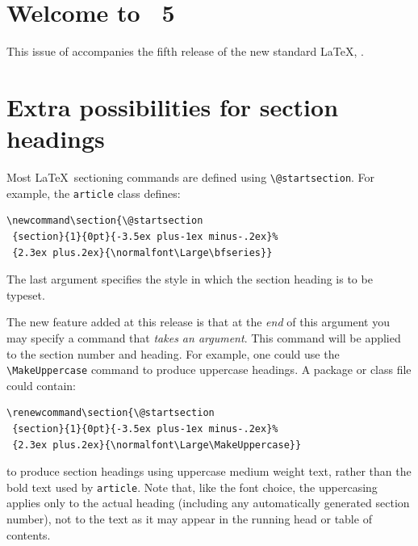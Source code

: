 \documentclass{ltnews}
\providecommand\cls[1]{\texttt{#1}}
\begin{document}
\maketitle

\section{Welcome to \LaTeXNews~5}
This  issue of \emph{\LaTeXNews} accompanies the fifth release of the
new standard \LaTeX{}, \LaTeXe.

\section{Extra possibilities for section headings}
Most \LaTeX\ sectioning commands are defined using
\verb|\@startsection|.
For example, the \cls{article} class defines:
\begin{small}
\begin{verbatim}
\newcommand\section{\@startsection
 {section}{1}{0pt}{-3.5ex plus-1ex minus-.2ex}%
 {2.3ex plus.2ex}{\normalfont\Large\bfseries}}
\end{verbatim}
\end{small}
The last argument specifies the style in which the section heading is
to be typeset.

The new feature added at this release is that at the \emph{end} of
this argument you may specify a command that \emph{takes an argument}.
This command will be applied to the section number and heading.
For example, one could use the \verb|\MakeUppercase| command to
produce uppercase headings. A package or class file could contain:
\begin{small}
\begin{verbatim}
\renewcommand\section{\@startsection
 {section}{1}{0pt}{-3.5ex plus-1ex minus-.2ex}%
 {2.3ex plus.2ex}{\normalfont\Large\MakeUppercase}}
\end{verbatim}
\end{small}
to produce section headings using uppercase medium weight text, rather
than the bold text used by \cls{article}. Note that, like the font
choice, the uppercasing applies only to the actual heading (including
any automatically generated section number), not to the text as it may
appear in the running head or table of contents.
\end{document}
